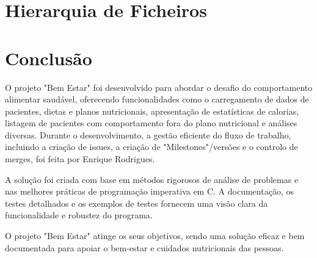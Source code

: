 \documentclass[twoside]{book}
\newcommand{\+}{\discretionary{\mbox{\scriptsize$\hookleftarrow$}}{}{}}
\begin{document}
  \section*{Hierarquia de Ficheiros}

  \newpage
  \clearpage
  \section*{Conclusão}
  
  O projeto "Bem Estar" foi desenvolvido para abordar o desafio do comportamento alimentar saudável, oferecendo funcionalidades como o carregamento de dados de pacientes, dietas e planos nutricionais, apresentação de estatísticas de calorias, listagem de pacientes com comportamento fora do plano nutricional e análises diversas. Durante o desenvolvimento, a gestão eficiente do fluxo de trabalho, incluindo a criação de issues, a criação de "Milestones"/versões e o controlo de merges, foi feita por Enrique Rodrigues.
  \par
  A solução foi criada com base em métodos rigorosos de análise de problemas e nas melhores práticas de programação imperativa em C. A documentação, os testes detalhados e os exemplos de testes fornecem uma visão clara da funcionalidade e robustez do programa.
  \par
  O projeto "Bem Estar" atinge os seus objetivos, sendo uma solução eficaz e bem documentada para apoiar o bem-estar e cuidados nutricionais das pessoas.

  \newpage
  
  \nocite{*}
  
  
\end{document}
